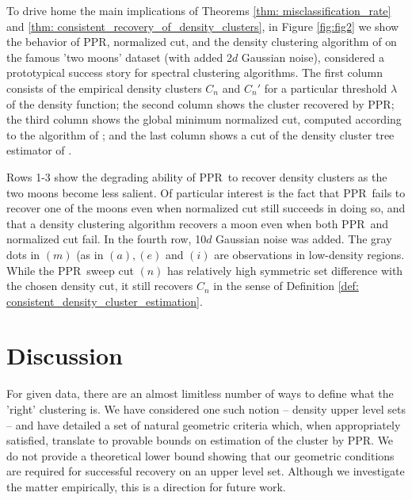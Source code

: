 \documentclass{article}
\newcommand{\1}{\mathbf{1}}
\newcommand{\ppr}{{\sc PPR}}
\newcommand{\pprspace}{{\sc PPR~}}
\theoremstyle{aldenthm}
\theoremstyle{aldenrmrk}
\begin{document}
To drive home the main implications of Theorems \ref{thm: misclassification_rate} and \ref{thm: consistent_recovery_of_density_clusters}, in Figure \ref{fig:fig2} we show the behavior of \ppr, normalized cut, and the density clustering algorithm of \citep{chaudhuri2010} on the famous 'two moons' dataset (with added 2$d$ Gaussian noise), considered a prototypical success story for spectral clustering algorithms. The first column consists of the empirical density clusters $C_n$ and $C_n'$ for a particular threshold $\lambda$ of the density function; the second column shows the cluster recovered by \ppr; the third column shows the global minimum normalized cut, computed according to the algorithm of \cite{szlam2010}; and the last column shows a cut of the density cluster tree estimator of \citep{chaudhuri2010}.

Rows 1-3 show the degrading ability of \pprspace to recover density clusters as the two moons become less salient. Of particular interest is the fact that \pprspace fails to recover one of the moons even when normalized cut still succeeds in doing so, and that a density clustering algorithm recovers a moon even when both \pprspace and normalized cut fail. In the fourth row, 10$d$ Gaussian noise was added. The gray dots in $(m)$ (as in $(a), (e)$ and $(i)$ are observations in low-density regions. While the \pprspace sweep cut $(n)$ has relatively high symmetric set difference with the chosen density cut, it still recovers $C_n$ in the sense of Definition \ref{def: consistent_density_cluster_estimation}.

\section{Discussion}
\label{sec: discussion}
For given data, there are an almost limitless number of ways to define what the 'right' clustering is. We have considered one such notion -- density upper level sets -- and have detailed a set of natural geometric criteria which, when appropriately satisfied, translate to provable bounds on estimation of the cluster by \ppr. We do not provide a theoretical lower bound showing that our geometric conditions are required for successful recovery on an upper level set. Although we investigate the matter empirically, this is a direction for future work.

\clearpage



\end{document}
